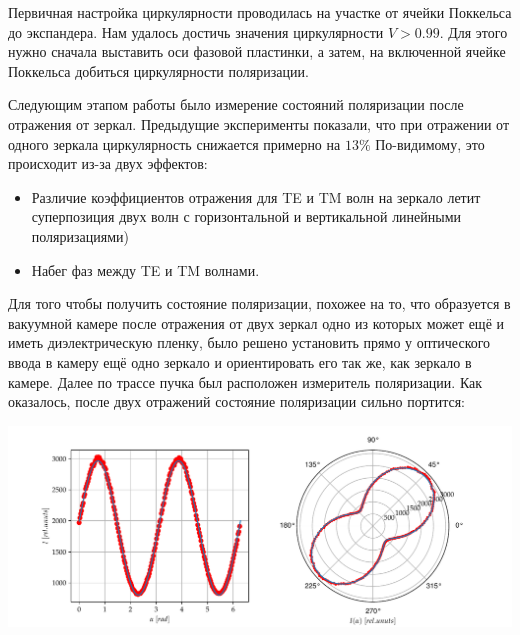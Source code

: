\documentclass[12pt]{article}
\begin{document}
\par Первичная настройка циркулярности проводилась на участке от ячейки Поккельса до экспандера. Нам удалось достичь значения циркулярности $V>0.99$. Для этого нужно сначала выставить оси фазовой пластинки, а затем, на включенной ячейке Поккельса добиться циркулярности поляризации.
\par Следующим этапом работы было измерение состояний поляризации после отражения от зеркал. Предыдущие эксперименты показали, что при отражении от одного зеркала циркулярность снижается примерно на $13\%$ По-видимому, это происходит из-за двух эффектов:
\begin{itemize}
	\item Различие коэффициентов отражения для TE и TM волн на зеркало летит суперпозиция двух волн с горизонтальной и вертикальной линейными поляризациями)
	\item Набег фаз между TE и TM волнами. 
\end{itemize}
Для того чтобы получить состояние поляризации, похожее на то, что образуется в вакуумной камере после отражения от двух зеркал одно из которых может ещё и иметь диэлектрическую пленку, было решено установить прямо у оптического ввода в камеру ещё одно зеркало и ориентировать его так же, как зеркало в камере. Далее по трассе пучка был расположен измеритель поляризации. Как оказалось, после двух отражений состояние поляризации сильно портится:
\begin{center}
	\includegraphics[width=16cm]{img/I_plot_no_corr}
	\label{fig:/I_plot_no_corr}
\end{center}
\end{document}
